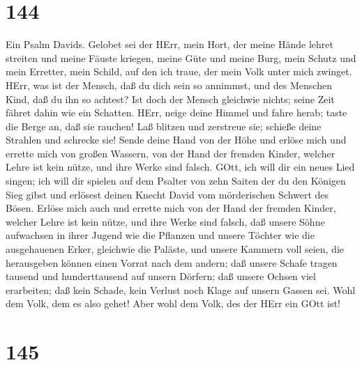 \hypertarget{section-143}{%
\section{144}\label{section-143}}

 Ein Psalm Davids. Gelobet sei der HErr, mein Hort, der
meine Hände lehret streiten und meine Fäuste kriegen,  meine
Güte und meine Burg, mein Schutz und mein Erretter, mein Schild, auf den
ich traue, der mein Volk unter mich zwinget.  HErr, was ist
der Mensch, daß du dich sein so annimmst, und des Menschen Kind, daß du
ihn so achtest?  Ist doch der Mensch gleichwie nichts; seine
Zeit fähret dahin wie ein Schatten.  HErr, neige deine
Himmel und fahre herab; taste die Berge an, daß sie rauchen!
 Laß blitzen und zerstreue sie; schieße deine Strahlen und
schrecke sie!  Sende deine Hand von der Höhe und erlöse mich
und errette mich von großen Wassern, von der Hand der fremden Kinder,
 welcher Lehre ist kein nütze, und ihre Werke sind falsch.
 GOtt, ich will dir ein neues Lied singen; ich will dir
spielen auf dem Psalter von zehn Saiten  der du den Königen
Sieg gibst und erlösest deinen Knecht David vom mörderischen Schwert des
Bösen.  Erlöse mich auch und errette mich von der Hand der
fremden Kinder, welcher Lehre ist kein nütze, und ihre Werke sind
falsch,  daß unsere Söhne aufwachsen in ihrer Jugend wie
die Pflanzen und unsere Töchter wie die ausgehauenen Erker, gleichwie
die Paläste,  und unsere Kammern voll seien, die
herausgeben können einen Vorrat nach dem andern; daß unsere Schafe
tragen tausend und hunderttausend auf unsern Dörfern;  daß
unsere Ochsen viel erarbeiten; daß kein Schade, kein Verlust noch Klage
auf unsern Gassen sei.  Wohl dem Volk, dem es also gehet!
Aber wohl dem Volk, des der HErr ein GOtt ist!

\hypertarget{section-144}{%
\section{145}\label{section-144}}

